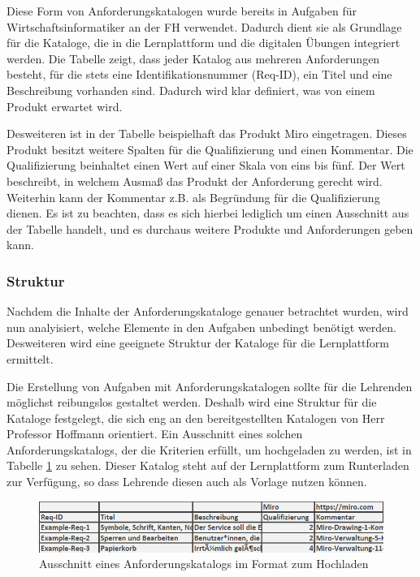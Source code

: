 Diese Form von Anforderungskatalogen wurde bereits in Aufgaben für Wirtschaftsinformatiker an der FH verwendet. Dadurch dient sie als Grundlage für die Kataloge, die in die Lernplattform und die digitalen Übungen integriert werden.
Die Tabelle zeigt, dass jeder Katalog aus mehreren Anforderungen besteht, für die stets eine Identifikationsnummer (Req-ID), ein Titel und eine Beschreibung vorhanden sind. Dadurch wird klar definiert, was von einem Produkt erwartet wird.

Desweiteren ist in der Tabelle beispielhaft das Produkt \glqq Miro\grqq{}  eingetragen. Dieses Produkt besitzt weitere Spalten für die Qualifizierung und einen Kommentar. Die Qualifizierung beinhaltet einen Wert auf einer Skala von eins bis fünf. Der Wert beschreibt, in welchem Ausmaß das Produkt der Anforderung gerecht wird. Weiterhin kann der Kommentar z.B. als Begründung für die Qualifizierung dienen. Es ist zu beachten, dass es sich hierbei lediglich um einen Ausschnitt aus der Tabelle handelt, und es durchaus weitere Produkte und Anforderungen geben kann.

\subsubsection{Struktur} 
Nachdem die Inhalte der Anforderungskataloge genauer betrachtet wurden, wird nun analyisiert, welche Elemente in den Aufgaben unbedingt benötigt werden. Desweiteren wird eine geeignete Struktur der Kataloge für die Lernplattform ermittelt. 

Die Erstellung von Aufgaben mit Anforderungskatalogen sollte für die Lehrenden möglichst reibungslos gestaltet werden. Deshalb wird eine Struktur für die Kataloge festgelegt, die sich eng an den bereitgestellten Katalogen von Herr Professor Hoffmann orientiert.
Ein Ausschnitt eines solchen Anforderungskatalogs, der die Kriterien erfüllt, um hochgeladen zu werden, ist in Tabelle \ref{fig:Anforderungskatalog-Hochladen-Bsp} zu sehen. Dieser Katalog steht auf  der Lernplattform zum Runterladen zur Verfügung, so dass Lehrende diesen auch als Vorlage nutzen können.

\begin{figure}[H]
    \centering
    \includegraphics[width=1.0\textwidth]{assets/screenshots/kataloge/UnserKatalogBspAusschnitt.png}
    \caption{Ausschnitt eines Anforderungskatalogs im Format zum Hochladen}
    \label{fig:Anforderungskatalog-Hochladen-Bsp}
\end{figure}

